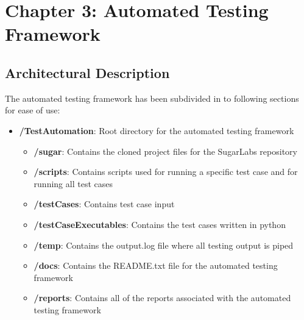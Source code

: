\documentclass{article}
\begin{document}
\section{Chapter 3: Automated Testing Framework}
\subsection{Architectural Description}
The automated testing framework has been subdivided in to following sections for ease of use:
\begin{itemize}[noitemsep,topsep=0pt]
\item[]\textbf{/TestAutomation}: Root directory for the automated testing framework
\begin{itemize}[noitemsep,topsep=0pt]
\item[]\textbf{/sugar}: Contains the cloned project files for the SugarLabs repository
\item[]\textbf{/scripts}: Contains scripts used for running a specific test case and for running all test cases
\item[]\textbf{/testCases}: Contains test case input
\item[]\textbf{/testCaseExecutables}: Contains the test cases written in python
\item[]\textbf{/temp}: Contains the output.log file where all testing output is piped
\item[]\textbf{/docs}: Contains the README.txt file for the automated testing framework
\item[]\textbf{/reports}: Contains all of the reports associated with the automated testing framework
\end{itemize}
\end{itemize}
\end{document}
